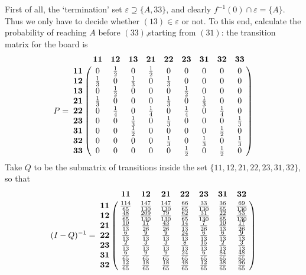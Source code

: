 \documentclass[aps,prl,twocolumn,floatfix,letterpaper]{revtex4}
\newenvironment{solution}[1][Solution]{\begin{trivlist}
    \item[\hskip \labelsep {\bfseries #1}]}{\end{trivlist}}
\begin{document}
\begin{solution}
First of all, the `termination' set $\varepsilon \supseteq \{ A, 33 \} $, and clearly 
$ f^{-1}(0) \cap \varepsilon = \{A\} $. 
Thus we only have to decide whether $(13) \in \varepsilon$ or not.
To this end, calculate the probability of reaching $A$ before $(33)$,starting from $(31)$: 
the transition matrix for the board is
\small
\begin{equation}
 P = 
 \bordermatrix{
	& \mathbf{11} & \mathbf{12} & \mathbf{13} & \mathbf{21} & \mathbf{22} & \mathbf{23} & \mathbf{31} & \mathbf{32} & \mathbf{33} \cr
\mathbf{11} & 	0	& \frac{1}{2}	& 0 	& \frac{1}{2} & 0 & 0 & 0 & 0 & 0	\cr
\mathbf{12} & \frac{1}{3} & 0 & \frac{1}{3} & 0 & \frac{1}{3} & 0 & 0 & 0 & 0		\cr
\mathbf{13} & 0 & \frac{1}{2} & 0 & 0 & 0 & \frac{1}{2} & 0 & 0 & 0			\cr
\mathbf{21} & \frac{1}{3} & 0 & 0 & 0 & \frac{1}{3} & 0 & \frac{1}{3} & 0 & 0		\cr
\mathbf{22} & 0 & \frac{1}{4} & 0 & \frac{1}{4} & 0 & \frac{1}{4} & 0 & \frac{1}{4} & 0 \cr
\mathbf{23} & 0 & 0 & \frac{1}{3} & 0 & \frac{1}{3} & 0 & 0 & 0 & \frac{1}{3}		\cr
\mathbf{31} & 0 & 0 & \frac{1}{2} & 0 & 0 & 0 & 0 & \frac{1}{2} & 0			\cr
\mathbf{32} & 0 & 0 & 0 & 0 & \frac{1}{3} & 0 & \frac{1}{3} & 0 & \frac{1}{3}		\cr
\mathbf{33} & 0 & 0 & 0 & 0 & 0 & \frac{1}{2} & 0 & \frac{1}{2} & 0
 }
\end{equation}
\normalsize
Take $Q$ to be the submatrix of transitions inside the set $\{11,12,21,22,23,31,32\}$, so that
\scriptsize
\begin{equation}
 (I-Q)^{-1} = 
 \bordermatrix{
& \mathbf{11} & \mathbf{12} & \mathbf{21} & \mathbf{22} & \mathbf{23} & \mathbf{31} & \mathbf{32} \cr
\mathbf{11} & \frac{114}{65} & \frac{147}{130} & \frac{147}{130} & \frac{66}{65} & \frac{33}{130} & \frac{36}{65} & \frac{69}{130}\cr
\mathbf{12} & \frac{48}{65} & \frac{209}{130} & \frac{79}{130} & \frac{62}{65} & \frac{31}{130} & \frac{22}{65} & \frac{53}{130}\cr 
\mathbf{21} &\frac{10}{13} & \frac{17}{26} & \frac{43}{26} & \frac{14}{13} & \frac{7}{26} & \frac{10}{13} & \frac{17}{26}\cr 
\mathbf{22} & \frac{6}{13} & \frac{9}{13} & \frac{9}{13} & \frac{24}{13} & \frac{6}{13} & \frac{6}{13} & \frac{9}{13}\cr
\mathbf{23} & \frac{2}{13} & \frac{3}{13} & \frac{3}{13} & \frac{8}{13} & \frac{15}{13} & \frac{2}{13} & \frac{3}{13}\cr
\mathbf{31} &\frac{6}{65} & \frac{9}{65} & \frac{9}{65} & \frac{24}{65} & \frac{6}{65} & \frac{84}{65} & \frac{48}{65}\cr 
\mathbf{32} &\frac{12}{65} & \frac{18}{65} & \frac{18}{65} & \frac{48}{65} & \frac{12}{65} & \frac{38}{65} & \frac{96}{65}
}
\end{equation}
\end{solution}
\end{document}
